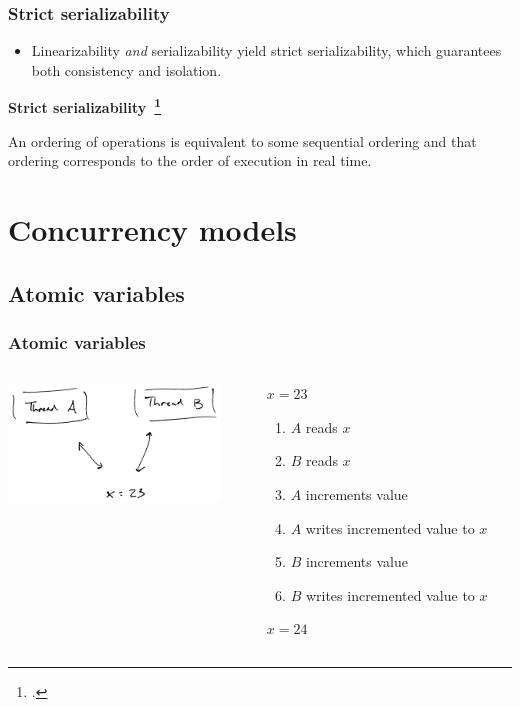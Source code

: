 \documentclass[aspectratio=1610]{beamer}
\begin{document}
  \begin{frame}
    \frametitle{Strict serializability}

    \begin{itemize}
      \item Linearizability \emph{and} serializability yield strict serializability, which guarantees both consistency and isolation.
    \end{itemize}

    \vfill

    \textbf{Strict serializability~\footcite{Herlihy1990}}

    An ordering of operations is equivalent to some sequential ordering and that ordering corresponds to the order of execution in real time.
  \end{frame}

  \section{Concurrency models}

  \subsection{Atomic variables}

  \begin{frame}
    \frametitle{Atomic variables}

    \begin{columns}
      \begin{column}{0.5\textwidth}
        \centering
        \includegraphics[width=160pt]{../figures/nonatomic}
      \end{column}
      \hfill
      \begin{column}{0.5\textwidth}
        $x = 23$

        \begin{enumerate}
          \item $A$ reads $x$
          \item $B$ reads $x$
          \item $A$ increments value
          \item $A$ writes incremented value to $x$
          \item $B$ increments value
          \item $B$ writes incremented value to $x$
        \end{enumerate}

        $x = 24$
      \end{column}
    \end{columns}
  \end{frame}
\end{document}
